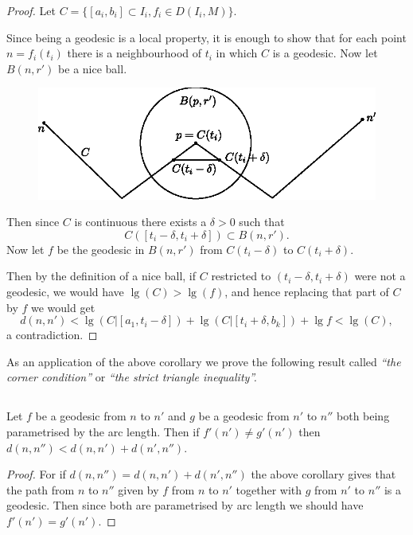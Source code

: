 \begin{proof}
Let $C=\{[a_{i},b_{i}]\subset I_{i},f_{i}\in D(I_{i},M)\}$.

Since being a geodesic is a local property, it is enough to show that
for each point $n=f_{i}(t_{i})$ there is a neighbourhood of $t_{i}$ in
which $C$ is a geodesic. Now let $B(n,r')$ be a nice ball.
\begin{figure}[H]
\centering
\includegraphics{figures/chap7-fig4.eps}
\end{figure}
\noindent
Then since $C$ is continuous there exists a $\delta>0$ such that
$$
C([t_{i}-\delta,t_{i}+\delta])\subset B(n,r').
$$
Now let $f$ be the geodesic in $B(n,r')$ from $C(t_{i}-\delta)$ to
$C(t_{i}+\delta)$. 

Then by the definition of a nice ball, if $C$ restricted to
$(t_{i}-\delta, t_{i}+\delta)$ were not a geodesic, we would have
$\lg(C)>\lg(f)$, and hence replacing that part of $C$ by $f$ we would
get
$$
d(n,n')<\lg(C|[a_{1},t_{i}-\delta])+\lg(C|[t_{i}+\delta,b_{k}])+\lg
f<\lg(C),
$$
a contradiction. 
\end{proof}

As \pageoriginale an application of the above corollary we prove the
following result called {\em ``the corner condition''} or {\em ``the
  strict triangle inequality''.}

\setcounter{subsection}{5}
\subsection{}\label{chap7:7.3.6}


\begin{application*}
Let $f$ be a geodesic from $n$ to $n'$ and $g$ be a geodesic from $n'$
to $n''$ both being parametrised by the arc length. Then if
$f'(n')\neq g'(n')$ then $d(n,n'')<d(n,n')+d(n',n'')$. 
\end{application*}

\begin{proof}
For if $d(n,n'')=d(n,n')+d(n',n'')$ the above corollary gives that the
path from $n$ to $n''$ given by $f$ from $n$ to $n'$ together with $g$
from $n'$ to $n''$ is a geodesic. Then since both are parametrised by
arc length we should have $f'(n')=g'(n')$.
\end{proof}

